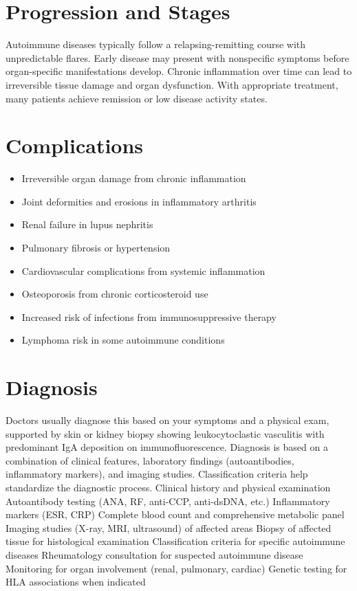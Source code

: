 \section{Progression and Stages}
Autoimmune diseases typically follow a relapsing-remitting course with unpredictable flares. Early disease may present with nonspecific symptoms before organ-specific manifestations develop. Chronic inflammation over time can lead to irreversible tissue damage and organ dysfunction. With appropriate treatment, many patients achieve remission or low disease activity states.
\section{Complications}
\begin{itemize}[noitemsep]
  \item Irreversible organ damage from chronic inflammation
  \item Joint deformities and erosions in inflammatory arthritis
  \item Renal failure in lupus nephritis
  \item Pulmonary fibrosis or hypertension
  \item Cardiovascular complications from systemic inflammation
  \item Osteoporosis from chronic corticosteroid use
  \item Increased risk of infections from immunosuppressive therapy
  \item Lymphoma risk in some autoimmune conditions
\end{itemize}
\section{Diagnosis}
Doctors usually diagnose this based on your symptoms and a physical exam, supported by skin or kidney biopsy showing leukocytoclastic vasculitis with predominant IgA deposition on immunofluorescence. Diagnosis is based on a combination of clinical features, laboratory findings (autoantibodies, inflammatory markers), and imaging studies. Classification criteria help standardize the diagnostic process. Clinical history and physical examination Autoantibody testing (ANA, RF, anti-CCP, anti-dsDNA, etc.) Inflammatory markers (ESR, CRP) Complete blood count and comprehensive metabolic panel Imaging studies (X-ray, MRI, ultrasound) of affected areas Biopsy of affected tissue for histological examination Classification criteria for specific autoimmune diseases Rheumatology consultation for suspected autoimmune disease Monitoring for organ involvement (renal, pulmonary, cardiac) Genetic testing for HLA associations when indicated


